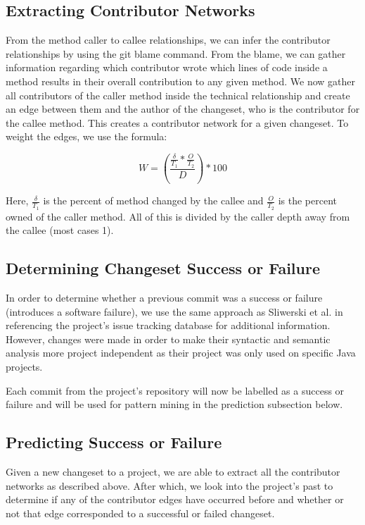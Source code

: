 \documentclass[conference]{IEEEtran}
\begin{document}
\subsection{Extracting Contributor Networks}
From the method caller to callee relationships, we can infer the contributor relationships by using
the git blame command. From the blame, we can gather information regarding which contributor 
wrote which lines of code inside a method results in their overall contribution to any given method.
We now gather all contributors of the caller method inside the technical relationship and create an
edge between them and the author of the changeset, who is the contributor for the callee method.
This creates a contributor network for a given changeset. To weight the edges, we use the formula:

\begin{equation}\label{first}
W = (\frac{\frac{\delta}{T_{1}}*\frac{O}{T_{2}}}{D})*100
\end{equation}

Here, $\frac{\delta}{T_{1}}$ is the percent of method changed by the callee and $\frac{O}{T_{2}}$ is the percent
owned of the caller method. All of this is divided by the caller depth away from the callee (most cases
1). 

\subsection{Determining Changeset Success or Failure}
In order to determine whether a previous commit was a success or failure (introduces a software
failure), we use the same approach as Sliwerski et al. \cite{Sliwerski:2005:CIF} in referencing the project's issue tracking
database for additional information. However, changes were made in order to make their syntactic 
and semantic analysis more project independent as their project was only used on specific Java projects. 

Each commit from the project's repository will now be labelled as a success
or failure and will be used for pattern mining in the prediction subsection below.

\subsection{Predicting Success or Failure}
Given a new changeset to a project, we are able to extract all the contributor networks as described
above. After which, we look into the project's past to determine if any of the contributor edges have
occurred before and whether or not that edge corresponded to a successful or failed changeset.
\end{document}
